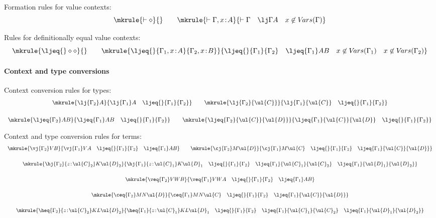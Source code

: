 \noindent
Formation rules for value contexts:
\vspace{0.15cm}
\[
\mkrule
{\vdash \diamond}
{}
\qquad
\mkrule
{\vdash \Gamma, x \!:\! A}
{\vdash \Gamma \quad \lj \Gamma A \quad x \not\in V\!ars(\Gamma)}
\]

\noindent
Rules for definitionally equal value contexts:
\vspace{0.15cm}
\[
\mkrule
{\ljeq {} \diamond \diamond}
{}
\qquad
\mkrule
{\ljeq {} {\Gamma_1, x \!:\! A} {\Gamma_2, x \!:\! B}}
{\ljeq {} {\Gamma_1} {\Gamma_2} \quad \ljeq {\Gamma_1} A B \quad x \not\in V\!ars(\Gamma_1) \quad x \not\in V\!ars(\Gamma_2)}
\]

\paragraph*{Context and type conversions} \mbox{}

\noindent
Context conversion rules for types:
\vspace{0.15cm}
\[
\begin{array}{c}
\mkrule
{\lj {\Gamma_2} A}
{\lj {\Gamma_1} A \quad \ljeq {} {\Gamma_1} {\Gamma_2}}
\qquad
\mkrule
{\lj {\Gamma_2} {\ul{C}}}
{\lj {\Gamma_1} {\ul{C}} \quad \ljeq {} {\Gamma_1} {\Gamma_2}}
\\[6mm]
\mkrule
{\ljeq {\Gamma_2} A B}
{\ljeq {\Gamma_1} A B \quad \ljeq {} {\Gamma_1} {\Gamma_2}}
\qquad
\mkrule
{\ljeq {\Gamma_2} {\ul{C}} {\ul{D}}}
{\ljeq {\Gamma_1} {\ul{C}} {\ul{D}} \quad \ljeq {} {\Gamma_1} {\Gamma_2}}
\end{array}
\]

\noindent
Context and type conversion rules for terms:
\vspace{0.15cm}
\[
\begin{array}{c}
\mkrule
{\vj {\Gamma_2} V B}
{\vj {\Gamma_1} V A \quad \ljeq {} {\Gamma_1} {\Gamma_2} \quad \ljeq {\Gamma_1} A B}
\qquad
\mkrule
{\cj {\Gamma_2} M {\ul{D}}}
{\cj {\Gamma_1} M {\ul{C}} \quad \ljeq {} {\Gamma_1} {\Gamma_2} \quad \ljeq {\Gamma_1} {\ul{C}} {\ul{D}}}
\\[6mm]
\mkrule
{\hj {\Gamma_2} {z \!:\! \ul{C}_2} K {\ul{D}_2}}
{\hj {\Gamma_1} {z \!:\! \ul{C}_1} K {\ul{D}_1} \quad \ljeq {} {\Gamma_1} {\Gamma_2} \quad \ljeq {\Gamma_1} {\ul{C}_1} {\ul{C}_2} \quad \ljeq {\Gamma_1} {\ul{D}_1} {\ul{D}_2}}
\\[6mm]
\mkrule
{\veq {\Gamma_2} V W B}
{\veq {\Gamma_1} V W A \quad \ljeq {} {\Gamma_1} {\Gamma_2} \quad \ljeq {\Gamma_1} A B}
\\[6mm]
\mkrule
{\ceq {\Gamma_2} M N {\ul{D}}}
{\ceq {\Gamma_1} M N {\ul{C}} \quad \ljeq {} {\Gamma_1} {\Gamma_2} \quad \ljeq {\Gamma_1} {\ul{C}} {\ul{D}}}
\\[6mm]
\mkrule
{\heq {\Gamma_2} {z \!:\! \ul{C}_2} K L {\ul{D}_2}}
{\heq {\Gamma_1} {z \!:\! \ul{C}_1} K L {\ul{D}_1} \quad \ljeq {} {\Gamma_1} {\Gamma_2} \quad \ljeq {\Gamma_1} {\ul{C}_1} {\ul{C}_2} \quad \ljeq {\Gamma_1} {\ul{D}_1} {\ul{D}_2}}
\end{array}
\]

